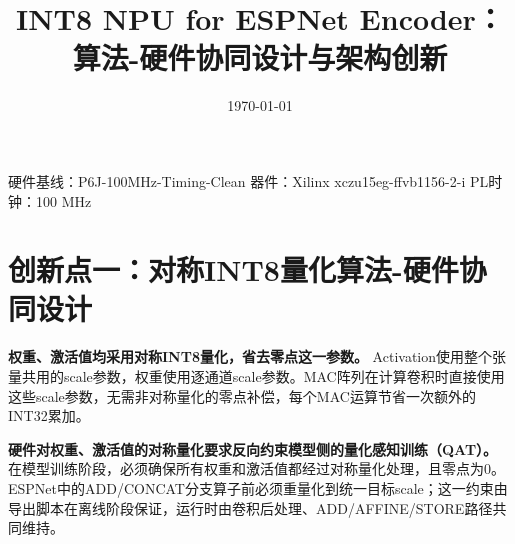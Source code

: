 \documentclass[11pt,a4paper]{article}
\begin{document}
\title{\textbf{INT8 NPU for ESPNet Encoder：算法-硬件协同设计与架构创新}}
\author{}
\date{\today}
\maketitle

\vspace{-8mm}
\begin{center}
\small 硬件基线：P6J-100MHz-Timing-Clean \quad 器件：Xilinx xczu15eg-ffvb1156-2-i \quad PL时钟：100 MHz
\end{center}


\section*{创新点一：对称INT8量化算法-硬件协同设计}

\textbf{权重、激活值均采用对称INT8量化，省去零点这一参数。} Activation使用整个张量共用的scale参数，权重使用逐通道scale参数。MAC阵列在计算卷积时直接使用这些scale参数，无需非对称量化的零点补偿，每个MAC运算节省一次额外的INT32累加。

\textbf{硬件对权重、激活值的对称量化要求反向约束模型侧的量化感知训练（QAT）。} 在模型训练阶段，必须确保所有权重和激活值都经过对称量化处理，且零点为0。ESPNet中的ADD/CONCAT分支算子前必须重量化到统一目标scale；这一约束由导出脚本在离线阶段保证，运行时由卷积后处理、ADD/AFFINE/STORE路径共同维持。

\begin{table}[h]
\centering
\caption{量化方案与类似工作对比}
\small
{}
\end{table}
\end{document}
